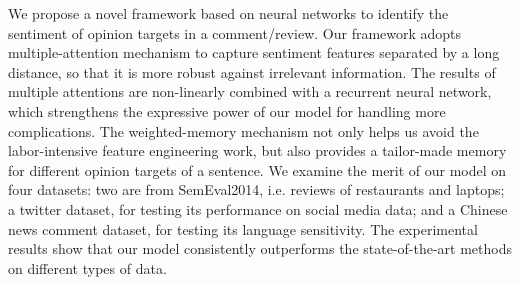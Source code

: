 We propose a novel framework based on neural networks to identify the sentiment of opinion targets in a comment/review. Our framework adopts multiple-attention mechanism to capture sentiment features separated by a long distance, so that it is more robust against irrelevant information. The results of multiple attentions are non-linearly combined with a recurrent neural network, which strengthens the expressive power of our model for handling more complications. The weighted-memory mechanism not only helps us avoid the labor-intensive feature engineering work, but also provides a tailor-made memory for different opinion targets of a sentence. We examine the merit of our model on four datasets: two are from SemEval2014, i.e. reviews of restaurants and laptops; a twitter dataset, for testing its performance on social media data; and a Chinese news comment dataset, for testing its language sensitivity. The experimental results show that our model consistently outperforms the state-of-the-art methods on different types of data.
